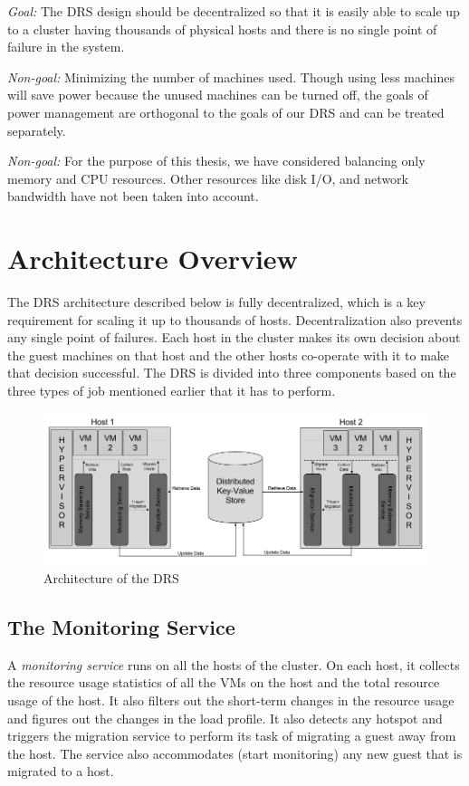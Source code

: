 \textit{Goal:} The DRS design should be decentralized so that it is easily able to scale up to a cluster having thousands of physical hosts and there is no single point of failure in the system.

\textit{Non-goal:} Minimizing the number of machines used. Though using less machines will save power because the unused machines can be turned off, the goals of power management are orthogonal to the goals of our DRS and can be treated separately.

\textit{Non-goal:} For the purpose of this thesis, we have considered balancing only memory and CPU resources. Other resources like disk I/O, and network bandwidth have not been taken into account.

\section{Architecture Overview}
The DRS architecture described below is fully decentralized, which is a key requirement for scaling it up to thousands of hosts. Decentralization also prevents any single point of failures. Each host in the cluster makes its own decision about the guest machines on that host and the other hosts co-operate with it to make that decision successful.
The DRS is divided into three components based on the three types of job mentioned earlier that it has to perform. 

\begin{figure}[!ht]
  \centering
  \includegraphics[width=\textwidth]{arch.png}
  \caption{Architecture of the DRS}\label{fig:mem}
\end{figure}

\subsection{The Monitoring Service}
A \textit{monitoring service} runs on all the hosts of the cluster. On each host, it collects the resource usage statistics of all the VMs on the host and the total resource usage of the host. It also filters out the short-term changes in the resource usage and figures out the changes in the load profile. It also detects any hotspot and triggers the migration service to perform its task of migrating a guest away from the host. The service also accommodates (start monitoring) any new guest that is migrated to a host. 

